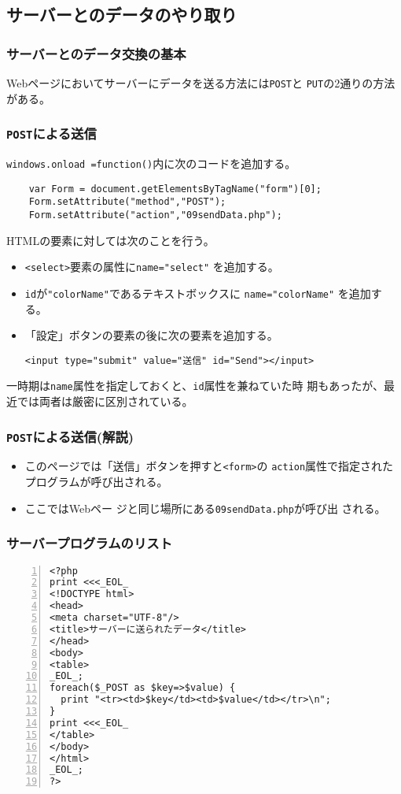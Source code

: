 \subsection{サーバーとのデータのやり取り}
\begin{frame}[containsverbatim]
\frametitle{サーバーとのデータ交換の基本}
Webページにおいてサーバーにデータを送る方法には\texttt{POST}と
\texttt{PUT}の2通りの方法がある。
\end{frame}
\begin{frame}[containsverbatim]
\frametitle{\texttt{POST}による送信}
\texttt{windows.onload =function()}内に次のコードを追加する。
\begin{verbatim}
    var Form = document.getElementsByTagName("form")[0];
    Form.setAttribute("method","POST");
    Form.setAttribute("action","09sendData.php");
\end{verbatim}
HTMLの要素に対しては次のことを行う。
\begin{itemize}
 \item \texttt{<select>}要素の属性に\verb+name="select"+ を追加する。
 \item \texttt{id}が\verb+"colorName"+であるテキストボックスに
       \verb+name="colorName"+ を追加する。
 \item 「設定」ボタンの要素の後に次の要素を追加する。
\begin{center}
\verb+<input type="submit" value="送信" id="Send"></input>+ 
\end{center}
\end{itemize}
一時期は\texttt{name}属性を指定しておくと、\texttt{id}属性を兼ねていた時
 期もあったが、最近では両者は厳密に区別されている。
\end{frame}
\begin{frame}[containsverbatim]
\frametitle{\texttt{POST}による送信(解説)}
\begin{itemize}
 \item このページでは「送信」ボタンを押すと\texttt{<form>}の
\texttt{action}属性で指定されたプログラムが呼び出される。
\item ここではWebペー ジと同じ場所にある\texttt{09sendData.php}が呼び出
      される。
\end{itemize}
\end{frame}
\begin{frame}[containsverbatim]
\frametitle{サーバープログラムのリスト}
\begin{Verbatim}[numbers=left, fontsize=\scriptsize]
 <?php
print <<<_EOL_
<!DOCTYPE html>
<head>
<meta charset="UTF-8"/>
<title>サーバーに送られたデータ</title>
</head>
<body>
<table>
_EOL_;
foreach($_POST as $key=>$value) {
  print "<tr><td>$key</td><td>$value</td></tr>\n";
}
print <<<_EOL_
</table>
</body>
</html>
_EOL_;
?>
\end{Verbatim}
\end{frame}
